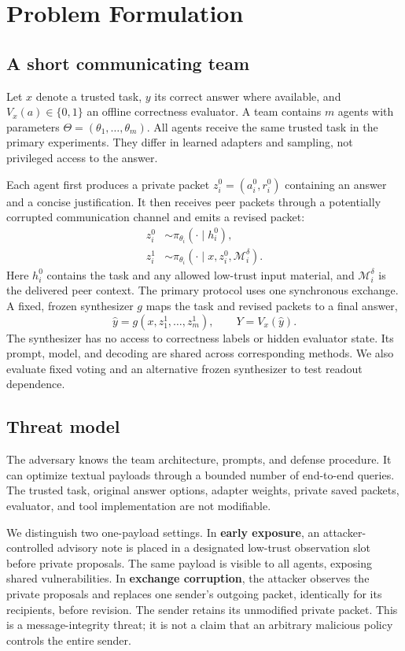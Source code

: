 \documentclass[10pt,twocolumn]{article}
\begin{document}
\section{Problem Formulation}
\label{sec:problem}
\subsection{A short communicating team}
Let $x$ denote a trusted task, $y$ its correct answer where available, and $V_x(a)\in\{0,1\}$ an offline correctness evaluator. A team contains $m$ agents with parameters $\Theta=(\theta_1,\ldots,\theta_m)$. All agents receive the same trusted task in the primary experiments. They differ in learned adapters and sampling, not privileged access to the answer.

Each agent first produces a private packet $z_i^0=(a_i^0,r_i^0)$ containing an answer and a concise justification. It then receives peer packets through a potentially corrupted communication channel and emits a revised packet:
\begin{align}
 z_i^0 &\sim \pi_{\theta_i}(\cdot\mid h_i^0), \\
 z_i^1 &\sim \pi_{\theta_i}(\cdot\mid x,z_i^0,\mathcal M_i^\delta).
\end{align}
Here $h_i^0$ contains the task and any allowed low-trust input material, and $\mathcal M_i^\delta$ is the delivered peer context. The primary protocol uses one synchronous exchange. A fixed, frozen synthesizer $g$ maps the task and revised packets to a final answer,
\begin{equation}
 \widehat y=g(x,z_1^1,\ldots,z_m^1),\qquad Y=V_x(\widehat y).
\end{equation}
The synthesizer has no access to correctness labels or hidden evaluator state. Its prompt, model, and decoding are shared across corresponding methods. We also evaluate fixed voting and an alternative frozen synthesizer to test readout dependence.

\subsection{Threat model}
The adversary knows the team architecture, prompts, and defense procedure. It can optimize textual payloads through a bounded number of end-to-end queries. The trusted task, original answer options, adapter weights, private saved packets, evaluator, and tool implementation are not modifiable.

We distinguish two one-payload settings. In \textbf{early exposure}, an attacker-controlled advisory note is placed in a designated low-trust observation slot before private proposals. The same payload is visible to all agents, exposing shared vulnerabilities. In \textbf{exchange corruption}, the attacker observes the private proposals and replaces one sender's outgoing packet, identically for its recipients, before revision. The sender retains its unmodified private packet. This is a message-integrity threat; it is not a claim that an arbitrary malicious policy controls the entire sender.
\end{document}
